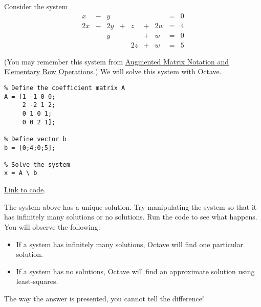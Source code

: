 \documentclass{ximera}
\begin{document}
\begin{example}\label{temp:systems1}
Consider the system
\begin{equation}
\begin{array}{ccccccccc}
      x &- &y&&&&&= &0 \\
	 2x& -&2y&+&z&+&2w&=&4\\
     & &y&&&+&w&=&0\\
     & &&&2z&+&w&=&5
    \end{array}
    \end{equation}

 (You may remember this system from \href{https://ximera.osu.edu/linearalgebrav3/LinearAlgebraInteractiveIntro/SYS-0020/main}{Augmented Matrix Notation and Elementary Row Operations}.)  We will solve this system with Octave.   
\begin{verbatim}
% Define the coefficient matrix A
A = [1 -1 0 0;
     2 -2 1 2;
     0 1 0 1;
     0 0 2 1];

% Define vector b
b = [0;4;0;5];

% Solve the system 
x = A \ b
\end{verbatim}

\href{https://sagecell.sagemath.org/?z=eJxFjsEKwjAQRO-B_Ye59FjYBD0FDwH_wGP1YMIGA7aBNpT69yZIcG-PeczsgKvEtAjKSxCyxJhCkqVgfpY1HXCkHC6YNEYNBltSaGcwGmiYzowW6z9yVfSjMqmhb-wSSl7hSfnWyfZk2Z67dMvv_ffH9tmKzCB1VM3hDv8FLh8nkA==&lang=octave&interacts=eJyLjgUAARUAuQ==}{Link to code}.

\begin{warning}
    The system above has a unique solution.  Try manipulating the system so that it has infinitely many solutions or no solutions.  Run the code to see what happens.  You will observe the following:

\begin{itemize}
    \item If a system has infinitely many solutions, Octave will find one particular solution.
    \item If a system has no solutions, Octave will find an approximate solution using least-squares.  %
\end{itemize}
The way the answer is presented, you cannot tell the difference!
\end{warning}

\end{example}


\end{document}
